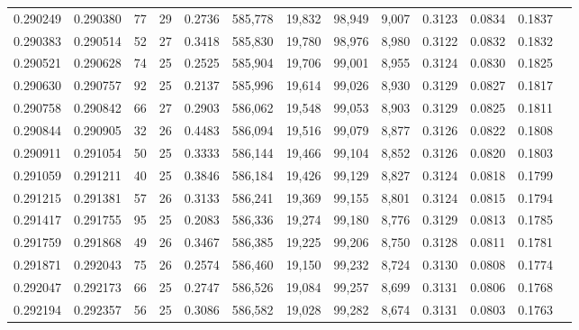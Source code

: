 \begin{tabular}{rrrrrrrrrrrrr}
0.290249 & 0.290380 &  77 &  29 &                                     0.2736 & 585,778 &  19,832 &  98,949 &   9,007 & 0.3123 & 0.0834 & 0.1837 \\
0.290383 & 0.290514 &  52 &  27 &                                     0.3418 & 585,830 &  19,780 &  98,976 &   8,980 & 0.3122 & 0.0832 & 0.1832 \\
0.290521 & 0.290628 &  74 &  25 &                                     0.2525 & 585,904 &  19,706 &  99,001 &   8,955 & 0.3124 & 0.0830 & 0.1825 \\
0.290630 & 0.290757 &  92 &  25 &                                     0.2137 & 585,996 &  19,614 &  99,026 &   8,930 & 0.3129 & 0.0827 & 0.1817 \\
0.290758 & 0.290842 &  66 &  27 &                                     0.2903 & 586,062 &  19,548 &  99,053 &   8,903 & 0.3129 & 0.0825 & 0.1811 \\
0.290844 & 0.290905 &  32 &  26 &                                     0.4483 & 586,094 &  19,516 &  99,079 &   8,877 & 0.3126 & 0.0822 & 0.1808 \\
0.290911 & 0.291054 &  50 &  25 &                                     0.3333 & 586,144 &  19,466 &  99,104 &   8,852 & 0.3126 & 0.0820 & 0.1803 \\
0.291059 & 0.291211 &  40 &  25 &                                     0.3846 & 586,184 &  19,426 &  99,129 &   8,827 & 0.3124 & 0.0818 & 0.1799 \\
0.291215 & 0.291381 &  57 &  26 &                                     0.3133 & 586,241 &  19,369 &  99,155 &   8,801 & 0.3124 & 0.0815 & 0.1794 \\
0.291417 & 0.291755 &  95 &  25 &                                     0.2083 & 586,336 &  19,274 &  99,180 &   8,776 & 0.3129 & 0.0813 & 0.1785 \\
0.291759 & 0.291868 &  49 &  26 &                                     0.3467 & 586,385 &  19,225 &  99,206 &   8,750 & 0.3128 & 0.0811 & 0.1781 \\
0.291871 & 0.292043 &  75 &  26 &                                     0.2574 & 586,460 &  19,150 &  99,232 &   8,724 & 0.3130 & 0.0808 & 0.1774 \\
0.292047 & 0.292173 &  66 &  25 &                                     0.2747 & 586,526 &  19,084 &  99,257 &   8,699 & 0.3131 & 0.0806 & 0.1768 \\
0.292194 & 0.292357 &  56 &  25 &                                     0.3086 & 586,582 &  19,028 &  99,282 &   8,674 & 0.3131 & 0.0803 & 0.1763 \\

\end{tabular}
